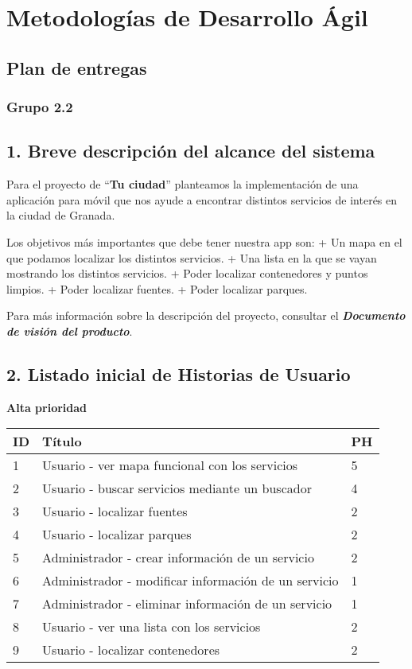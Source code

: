 \documentclass[]{article}
\date{}
\begin{document}
\section{Metodologías de Desarrollo
Ágil}\label{metodologuxedas-de-desarrollo-uxe1gil}

\subsection{Plan de entregas}\label{plan-de-entregas}

\subsubsection{Grupo 2.2}\label{grupo-2.2}

\subsection{1. Breve descripción del alcance del
sistema}\label{breve-descripciuxf3n-del-alcance-del-sistema}

Para el proyecto de ``\textbf{Tu ciudad}'' planteamos la implementación
de una aplicación para móvil que nos ayude a encontrar distintos
servicios de interés en la ciudad de Granada.

Los objetivos más importantes que debe tener nuestra app son: + Un mapa
en el que podamos localizar los distintos servicios. + Una lista en la
que se vayan mostrando los distintos servicios. + Poder localizar
contenedores y puntos limpios. + Poder localizar fuentes. + Poder
localizar parques.

Para más información sobre la descripción del proyecto, consultar el
\textbf{\emph{Documento de visión del producto}}.

\subsection{2. Listado inicial de Historias de
Usuario}\label{listado-inicial-de-historias-de-usuario}

\textbf{Alta prioridad}

\begin{longtable}[]{@{}lll@{}}
\toprule
ID & Título & PH\tabularnewline
\midrule
\endhead
1 & Usuario - ver mapa funcional con los servicios & 5\tabularnewline
2 & Usuario - buscar servicios mediante un buscador & 4\tabularnewline
3 & Usuario - localizar fuentes & 2\tabularnewline
4 & Usuario - localizar parques & 2\tabularnewline
5 & Administrador - crear información de un servicio & 2\tabularnewline
6 & Administrador - modificar información de un servicio &
1\tabularnewline
7 & Administrador - eliminar información de un servicio &
1\tabularnewline
8 & Usuario - ver una lista con los servicios & 2\tabularnewline
9 & Usuario - localizar contenedores & 2\tabularnewline
\bottomrule
\end{longtable}
\end{document}
